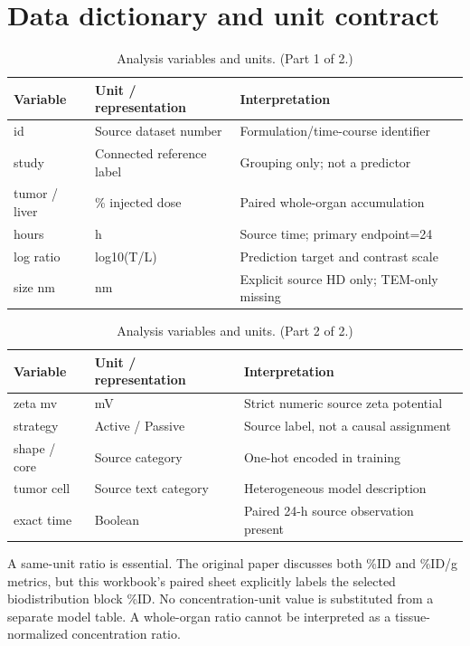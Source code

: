 \documentclass[11pt]{article}
\begin{document}
\section{Data dictionary and unit contract}
\begin{table}[H]
\centering
\small
\begin{tabularx}{\linewidth}{@{}>{\raggedright\arraybackslash}X>{\raggedright\arraybackslash}X>{\raggedright\arraybackslash}X@{}}
\toprule
\textbf{Variable} & \textbf{Unit /\allowbreak{} representation} & \textbf{Interpretation} \\
\midrule
id & Source dataset number & Formulation/\allowbreak{}time-course identifier \\
study & Connected reference label & Grouping only; not a predictor \\
tumor /\allowbreak{} liver & \% injected dose & Paired whole-organ accumulation \\
hours & h & Source time; primary endpoint=24 \\
log ratio & log10(T/\allowbreak{}L) & Prediction target and contrast scale \\
size nm & nm & Explicit source HD only; TEM-only missing \\
\bottomrule
\end{tabularx}
\caption{Analysis variables and units. (Part 1 of 2.)}
\label{tab:result-9}
\end{table}
\begin{table}[H]
\centering
\small
\ContinuedFloat
\begin{tabularx}{\linewidth}{@{}>{\raggedright\arraybackslash}X>{\raggedright\arraybackslash}X>{\raggedright\arraybackslash}X@{}}
\toprule
\textbf{Variable} & \textbf{Unit /\allowbreak{} representation} & \textbf{Interpretation} \\
\midrule
zeta mv & mV & Strict numeric source zeta potential \\
strategy & Active /\allowbreak{} Passive & Source label, not a causal assignment \\
shape /\allowbreak{} core & Source category & One-hot encoded in training \\
tumor cell & Source text category & Heterogeneous model description \\
exact time & Boolean & Paired 24-h source observation present \\
\bottomrule
\end{tabularx}
\caption{Analysis variables and units. (Part 2 of 2.)}
\end{table}
A same-unit ratio is essential. The original paper discusses both \%ID and \%ID/g metrics, but this workbook's paired sheet explicitly labels the selected biodistribution block \%ID. No concentration-unit value is substituted from a separate model table. A whole-organ ratio cannot be interpreted as a tissue-normalized concentration ratio.
\end{document}
